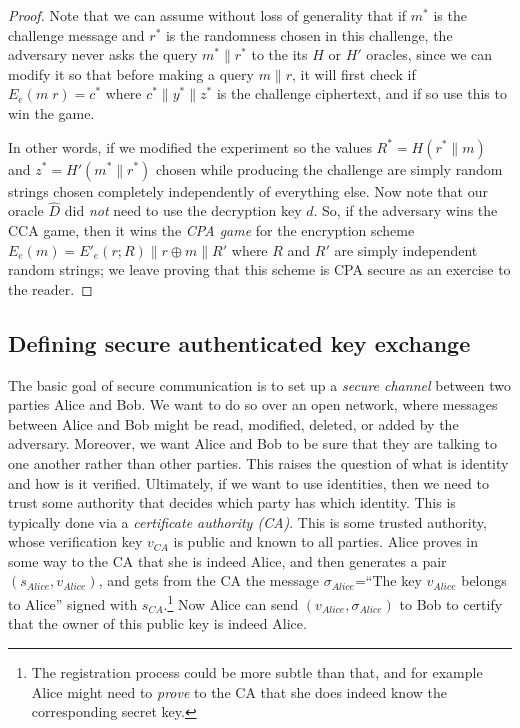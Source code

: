 \begin{proof}
Note that we can assume without loss of generality that if \(m^*\) is
the challenge message and \(r^*\) is the randomness chosen in this
challenge, the adversary never asks the query \(m^*\|r^*\) to the its
\(H\) or \(H'\) oracles, since we can modify it so that before making a
query \(m\|r\), it will first check if \(E_e(m\;r)=c^*\) where
\(c^*\|y^*\|z^*\) is the challenge ciphertext, and if so use this to win
the game.

In other words, if we modified the experiment so the values
\(R^*=H(r^*\|m)\) and \(z^*=H'(m^*\|r^*)\) chosen while producing the
challenge are simply random strings chosen completely independently of
everything else. Now note that our oracle \(\hat{D}\) did \emph{not}
need to use the decryption key \(d\). So, if the adversary wins the CCA
game, then it wins the \emph{CPA game} for the encryption scheme
\(E_e(m) = E'_e(r;R)\| r \oplus m \| R'\) where \(R\) and \(R'\) are
simply independent random strings; we leave proving that this scheme is
CPA secure as an exercise to the reader.

\end{proof}

\subsection{Defining secure authenticated key
exchange}\label{14-Defining-secure-authen}

The basic goal of secure communication is to set up a \emph{secure
channel} between two parties Alice and Bob. We want to do so over an
open network, where messages between Alice and Bob might be read,
modified, deleted, or added by the adversary. Moreover, we want Alice
and Bob to be sure that they are talking to one another rather than
other parties. This raises the question of what is identity and how is
it verified. Ultimately, if we want to use identities, then we need to
trust some authority that decides which party has which identity. This
is typically done via a \emph{certificate authority (CA)}. This is some
trusted authority, whose verification key \(v_{CA}\) is public and known
to all parties. Alice proves in some way to the CA that she is indeed
Alice, and then generates a pair \((s_{Alice},v_{Alice})\), and gets
from the CA the message \(\sigma_{Alice}\)=``The key \(v_{Alice}\)
belongs to Alice'' signed with \(s_{CA}\).\footnote{The registration
  process could be more subtle than that, and for example Alice might
  need to \emph{prove} to the CA that she does indeed know the
  corresponding secret key.} Now Alice can send
\((v_{Alice},\sigma_{Alice})\) to Bob to certify that the owner of this
public key is indeed Alice.

